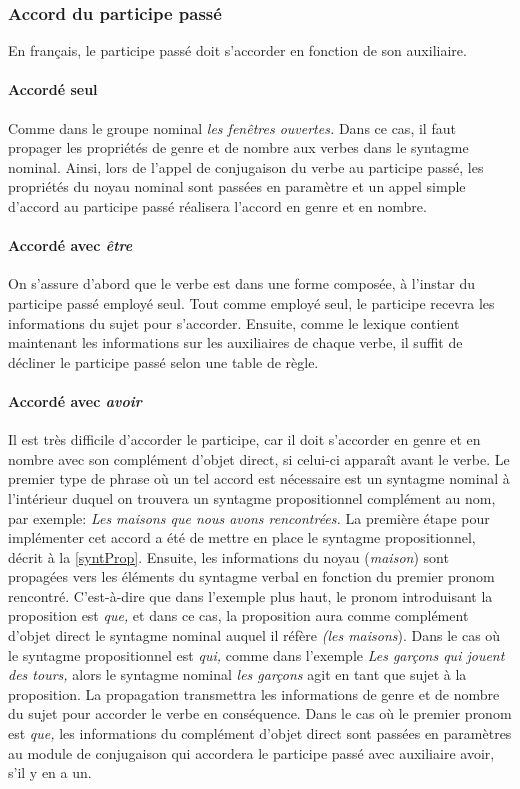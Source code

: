 \documentclass[11pt]{article} %
\begin{document}
\subsubsection{Accord du participe passé}
\label{subsec:accordpp}
En français, le participe passé doit s'accorder en fonction de son
auxiliaire. 

\paragraph{Accordé seul}

Comme dans le groupe nominal \emph{les fenêtres ouvertes.} Dans ce cas,
il faut propager les propriétés
de genre et de nombre aux verbes dans le syntagme
nominal. Ainsi, lors de l'appel de conjugaison du verbe
au participe passé, les propriétés du noyau nominal sont passées en
paramètre et un appel simple d'accord au participe passé réalisera
l'accord en genre et en nombre.

\paragraph{Accordé avec \emph{être}}

On s'assure d'abord que le verbe est dans une forme composée,
à l'instar du participe passé employé seul. Tout comme employé seul, le participe
recevra les informations du sujet pour s'accorder. Ensuite, comme le lexique
contient maintenant les informations sur les auxiliaires de chaque
verbe, il suffit de décliner le participe passé selon une table de
règle.

\paragraph{Accordé avec \emph{avoir}}

Il est très difficile d'accorder le participe, car il doit s'accorder en genre et en nombre avec
son complément d'objet direct, si celui-ci apparaît avant le verbe. Le
premier type de phrase où un tel accord est nécessaire est un syntagme
nominal à l'intérieur duquel on trouvera un syntagme propositionnel
complément au nom, par exemple: \emph{Les maisons que nous avons rencontrées.}
La première étape pour implémenter cet accord a été de mettre en place
le syntagme propositionnel, décrit à la \autoref{syntProp}.
Ensuite, les informations du noyau (\emph{maison}) sont propagées
vers les éléments du syntagme verbal en fonction du premier pronom
rencontré. C'est-à-dire que dans l'exemple plus haut, le pronom introduisant
la proposition est \emph{que,} et dans ce cas, la proposition aura
comme complément d'objet direct le syntagme nominal auquel il réfère \emph{(les
maisons}). Dans le cas où le syntagme propositionnel
est \emph{qui, }comme dans l'exemple \emph{Les garçons qui jouent
des tours,} alors le syntagme nominal \emph{les garçons }agit en tant
que sujet à la proposition. La propagation transmettra les informations de genre et de nombre
du sujet pour accorder le verbe en conséquence. Dans le cas où le premier pronom est \emph{que,
}les informations du complément d'objet direct sont passées en paramètres
au module de conjugaison qui accordera le participe passé avec auxiliaire
avoir, s'il y en a un.
\end{document}
